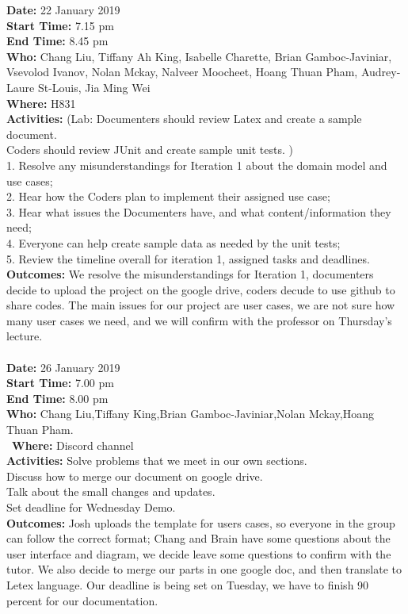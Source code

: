 \documentclass[12pt]{article}
\begin{document}
{\bf Date:} 22 January 2019\\
{\bf Start Time:} 7.15 pm\\
{\bf End Time:} 8.45 pm \\
{\bf Who:} Chang Liu, Tiffany Ah King, Isabelle Charette, Brian Gamboc-Javiniar, Vsevolod Ivanov, Nolan Mckay, Nalveer Moocheet, Hoang Thuan Pham, Audrey-Laure St-Louis, Jia Ming Wei\\
{\bf Where:} H831 \\
{\bf Activities:} (Lab: Documenters should review Latex and create a sample document.\\
Coders should review JUnit and create sample unit tests. )\\
1. Resolve any misunderstandings for Iteration 1 about the domain model and use cases;\\
2. Hear how the Coders plan to implement their assigned use case;\\
3. Hear what issues the Documenters have, and what content/information they need; \\
4. Everyone can help create sample data as needed by the unit tests; \\
5. Review the timeline overall for iteration 1, assigned tasks and deadlines.\\
{\bf Outcomes:} We resolve the misunderstandings for Iteration 1, documenters decide to upload the project on the google drive, coders decude to use github to share codes. The main issues for our project are user cases, we are not sure how many user cases we need, and we will confirm with the professor on Thursday's lecture.\\\\



{\bf Date:} 26 January 2019\\
{\bf Start Time:} 7.00 pm\\
{\bf End Time:} 8.00 pm \\
{\bf Who:} Chang Liu,Tiffany King,Brian Gamboc-Javiniar,Nolan Mckay,Hoang Thuan Pham.\\
\
{\bf Where:} Discord channel \\
{\bf Activities:} Solve problems that we meet in our own sections. \\
Discuss how to merge our document on google drive.\\
Talk about the small changes and updates.\\
Set deadline for Wednesday Demo.\\
{\bf Outcomes:} Josh uploads the template for users cases, so everyone in the group can follow the correct format;
Chang and Brain have some questions about the user interface and diagram, we decide leave some questions to confirm with the tutor. We also decide to merge our parts in one google doc, and then translate to Letex language. Our deadline is being set on Tuesday, we have to finish 90 percent for our documentation.\\\\
\end{document}
